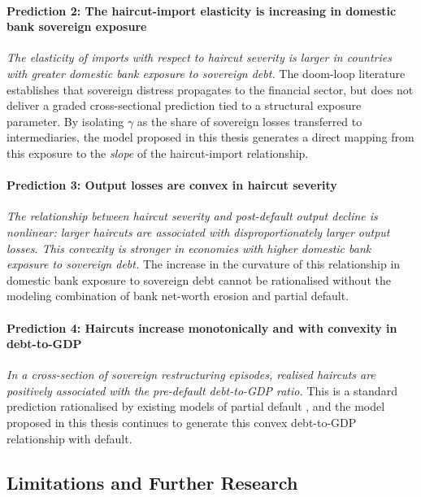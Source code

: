 \documentclass[11pt]{article}
\theoremstyle{definition}
\theoremstyle{plain}
\theoremstyle{remark}
\begin{document}
\paragraph{Prediction 2: The haircut-import elasticity is increasing in domestic bank sovereign exposure}
\emph{The elasticity of imports with respect to haircut severity is larger in countries with greater domestic bank exposure to sovereign debt.} The doom-loop literature \citep{sosa-padilla_sovereign_2018, brunnermeier_sovereign-bank_2016} establishes that sovereign distress propagates to the financial sector, but does not deliver a graded cross-sectional prediction tied to a structural exposure parameter. By isolating $\gamma$ as the share of sovereign losses transferred to intermediaries, the model proposed in this thesis generates a direct mapping from this exposure to the \textit{slope} of the haircut-import relationship.

\paragraph{Prediction 3: Output losses are convex in haircut severity}
\emph{The relationship between haircut severity and post-default output decline is nonlinear: larger haircuts are associated with disproportionately larger output losses. This convexity is stronger in economies with higher domestic bank exposure to sovereign debt.} The increase in the curvature of this relationship in domestic bank exposure to sovereign debt cannot be rationalised without the modeling combination of bank net-worth erosion and partial default.

\paragraph{Prediction 4: Haircuts increase monotonically and with convexity in debt-to-GDP} 
\emph{In a cross-section of sovereign restructuring episodes, realised haircuts are positively associated with the pre-default debt-to-GDP ratio.} This is a standard prediction rationalised by existing models of partial default \citep{arellano_partial_2023, goodhart_debt_2018, peiris_capital_2025}, and the model proposed in this thesis continues to generate this convex debt-to-GDP relationship with default.

\subsection{Limitations and Further Research}
\end{document}
